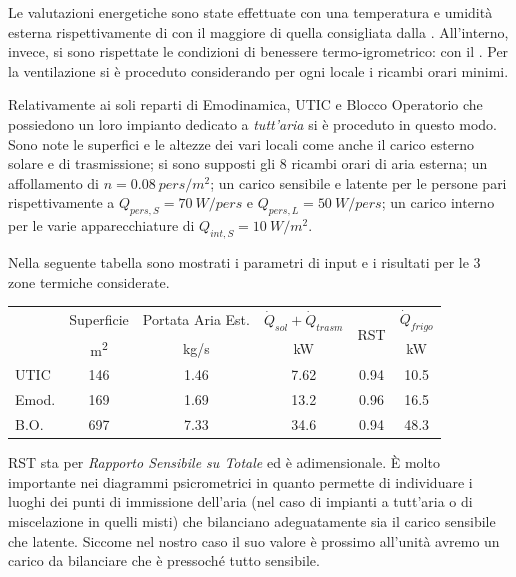 Le valutazioni energetiche sono state effettuate con una temperatura e umidità esterna rispettivamente di  con il  maggiore di quella consigliata dalla \norvent. All'interno, invece, si sono rispettate le condizioni di benessere termo-igrometrico:  con il . Per la ventilazione si è proceduto considerando per ogni locale i ricambi orari minimi.

Relativamente ai soli reparti di Emodinamica, UTIC e Blocco Operatorio che possiedono un loro impianto dedicato a \emph{tutt'aria} si è proceduto in questo modo.
Sono note le superfici e le altezze dei vari locali come anche il carico esterno solare e di trasmissione; si sono supposti gli \num{8} ricambi orari di aria esterna; un affollamento di $n=\SI{0.08}{pers/m^2}$; un carico sensibile e latente per le persone pari rispettivamente a $Q_{pers,S}=\SI{70}{W/pers}$ e $Q_{pers,L}=\SI{50}{W/pers}$; un carico interno per le varie apparecchiature di $Q_{int,S}=\SI{10}{W/m^2}$. 

Nella seguente tabella sono mostrati i parametri di input e i risultati per le 3 zone termiche considerate.
\begin{center}
	\begin{tabular}{lccccc}
		\toprule
					&	Superficie 				&	Portata Aria Est. 			&	$\dot{Q}_{sol}+\dot{Q}_{trasm}$		& 	\multirow{2}{*}{RST}		&	$\dot{Q}_{frigo}$ 	\\
					&	{\small \si{m^2}}		&		{\small \si{kg/s}}		&		{\small \si{kW}}				&								&{\small \si{kW}}		\\					
		\midrule	
		UTIC		&		\num{146}			&		\num{1.46}				&	\num{7.62}		&	0.94					&	\num{10.5}		\\
		Emod.		&		\num{169}			&		\num{1.69}				&	\num{13.2}		&	0.96					&	\num{16.5}		\\
		B.O.		&	\num{697}				&		\num{7.33}				&	\num{34.6}		&	0.94					&	\num{48.3}		\\
		\bottomrule
	\end{tabular}
\end{center}
RST sta per \emph{Rapporto Sensibile su Totale} ed è adimensionale. È molto importante nei diagrammi psicrometrici in quanto permette di individuare i luoghi dei punti di immissione dell'aria (nel caso di impianti a tutt'aria o di miscelazione in quelli misti) che bilanciano adeguatamente sia il carico sensibile che latente. Siccome nel nostro caso il suo valore è prossimo all'unità avremo un carico da bilanciare che è pressoché tutto sensibile.

